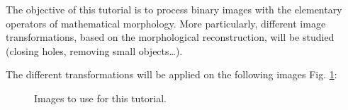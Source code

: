 \def\difficulty{1}
\label{tut:binarymorpho:enonce}

\begin{note}The objective of this tutorial is to process binary images with the elementary operators of mathematical morphology. More particularly, different image transformations, based on the morphological reconstruction, will be studied (closing holes, removing small objects\dots).\end{note}

The different transformations will be applied on the following images Fig. \ref{fig:morpho:images}:
\begin{figure}[htbp]
\centering\caption{Images to use for this tutorial.}
\hspace{.5cm}
\hspace{.5cm}
\hspace{.5cm}
%
 \label{fig:morpho:images}%
 \vspace*{-8pt}%
\end{figure}

